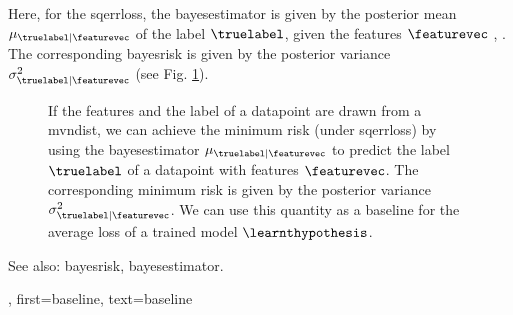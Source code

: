 {{	Here, for the \gls{sqerrloss}, the \gls{bayesestimator} is given by the posterior 
	\gls{mean} $\mu_{\truelabel|\featurevec}$ of the \gls{label} $\truelabel$, given the 
	\glspl{feature} $\featurevec$ \cite{LC}, \cite{GrayProbBook}. The corresponding \gls{bayesrisk} 
	is given by the posterior \gls{variance} 
	$\sigma^{2}_{\truelabel|\featurevec}$ (see Fig. \ref{fig_post_baseline_dict}).
	\begin{figure}[H]
		\begin{center}
		\end{center}
		\caption{If the \glspl{feature} and the \gls{label} of a \gls{datapoint} are drawn 
		from a \gls{mvndist}, we can achieve the \gls{minimum} \gls{risk} (under \gls{sqerrloss}) 
		by using the \gls{bayesestimator} $\mu_{\truelabel|\featurevec}$ 
		to predict the \gls{label} $\truelabel$ of a \gls{datapoint} with \glspl{feature} $\featurevec$. The corresponding 
		\gls{minimum} \gls{risk} is given by the posterior \gls{variance} $\sigma^{2}_{\truelabel|\featurevec}$. We can use 
		this quantity as a baseline for the average \gls{loss} of a trained \gls{model} $\learnthypothesis$. \label{fig_post_baseline_dict}}
		\end{figure}
		See also: \gls{bayesrisk}, \gls{bayesestimator}.},
    first={baseline},
    text={baseline}
}

